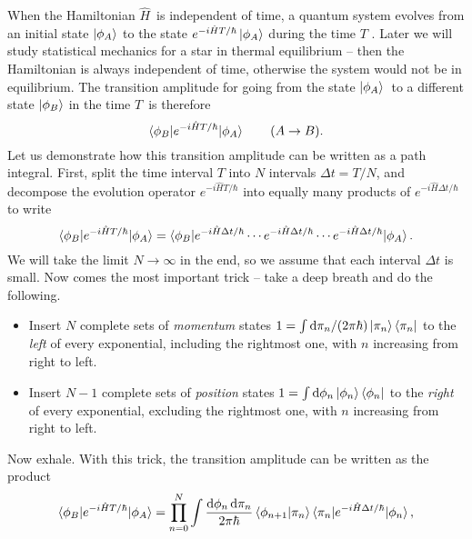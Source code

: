 When the Hamiltonian $\hat{H}$ is independent of time, a quantum system evolves from an initial state $\ket{\phi_A}$ to the state $e^{-i \hat{H} T / \hbar} \ket{\phi_A}$ during the time $T$ \cite[equation 2.28]{ref:sakurai}.
Later we will study statistical mechanics for a star in thermal equilibrium -- then the Hamiltonian is always independent of time, otherwise the system would not be in equilibrium.
The transition amplitude for going from the state $\ket{\phi_A}$ to a different state $\ket{\phi_B}$ in the time $T$ is therefore
\begin{equation}
	\braket{\phi_B | e^{- i \hat{H} T / \hbar} | \phi_A} \qquad (A \rightarrow B) .
	\label{eq:tft:transition_amplitude_intro}
\end{equation}
Let us demonstrate how this transition amplitude can be written as a path integral.
First, split the time interval $T$ into $N$ intervals $\Delta t = T / N$, and decompose the evolution operator $e^{- i \hat{H} T / \hbar}$ into equally many products of $e^{- i \hat{H} \Delta t / \hbar}$ to write
\newcommand\pointarrow[1]{\underset{\underset{\displaystyle #1}{\displaystyle \uparrow}}{}}
\begin{equation}
	\braket{\phi_B | e^{- i \hat{H} T / \hbar} | \phi_A} = \braket{\phi_B | e^{- i \hat{H} \Delta t / \hbar} \cdots e^{- i \hat{H} \Delta t / \hbar} \cdots e^{- i \hat{H} \Delta t / \hbar} | \phi_A} .
\label{eq:tft:time_evolution_splitting}
\end{equation}
We will take the limit $N \rightarrow \infty$ in the end, so we assume that each interval $\Delta t$ is small.
Now comes the most important trick -- take a deep breath and do the following.
\begin{itemize}
\item Insert $N$ complete sets of \emph{momentum} states $1 = \int \mathop{}\!\mathrm{d} \pi_n / (2 \pi \hbar) \ket{\pi_n} \bra{\pi_n}$ to the \emph{left} of every exponential, including the rightmost one, with $n$ increasing from right to left.
\item Insert $N-1$ complete sets of \emph{position} states $1 = \int \mathop{}\!\mathrm{d} \phi_n \ket{\phi_n} \bra{\phi_n}$ to the \emph{right} of every exponential, excluding the rightmost one, with $n$ increasing from right to left.
\end{itemize}
Now exhale.
With this trick, the transition amplitude can be written as the product
\begin{equation}
	\braket{\phi_B | e^{- i \hat{H} T / \hbar} | \phi_A} = \prod_{n=0}^{N} \int \frac{\mathop{}\!\mathrm{d} \phi_n \mathop{}\!\mathrm{d} \pi_n}{2 \pi \hbar} 
	             \braket{\phi_{n+1} | \pi_n} \braket{\pi_n | e^{- i \hat{H} \Delta t / \hbar} | \phi_n} ,
\label{eq:tft:transition_amplitude_product}
\end{equation}
